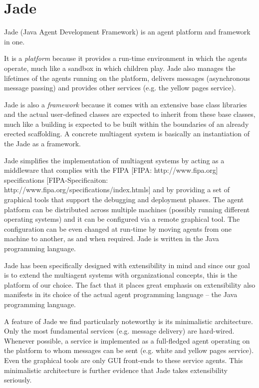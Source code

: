 \section{Jade}

Jade (Java Agent Development Framework) is an agent platform and framework in one.

It is a \textit{platform} because it provides a run-time environment in which the agents operate, much like a sandbox in which children play.
Jade also manages the lifetimes of the agents running on the platform, delivers messages (asynchronous message passing) and provides other services (e.g. the yellow pages service).

Jade is also a \textit{framework} because it comes with an extensive base class libraries and the actual user-defined classes are expected to inherit from these base classes, much like a building is expected to be built within the boundaries of an already erected scaffolding.
A concrete multiagent system is basically an instantiation of the Jade as a framework.

Jade simplifies the implementation of multiagent systems by acting as a middleware that complies with the FIPA
[FIPA: http://www.fipa.org]
specifications
[FIPA-Specificaiton: http://www.fipa.org/specifications/index.htmls] and by providing a set of graphical tools that support the debugging and deployment phases.
The agent platform can be distributed across multiple machines (possibly running different operating systems) and it can be configured via a remote graphical tool.
The configuration can be even changed at run-time by moving agents from one machine to another, as and when required. 
Jade is written in the Java programming language. 

Jade has been specifically designed with extensibility in mind and since our goal is to extend the multiagent systems with organizational concepts, this is the platform of our choice.
The fact that it places great emphasis on extensibility also manifests in its choice of the actual agent programming language -- the Java programming language.

A feature of Jade we find particularly noteworthy is its minimalistic architecture.
Only the most fundamental services (e.g. message delivery) are hard-wired.
Whenever possible, a service is implemented as a full-fledged agent operating on the platform to whom messages can be sent (e.g. white and yellow pages service).
Even the graphical tools are only GUI front-ends to these service agents.
This minimalistic architecture is further evidence that Jade takes extensibility seriously.

